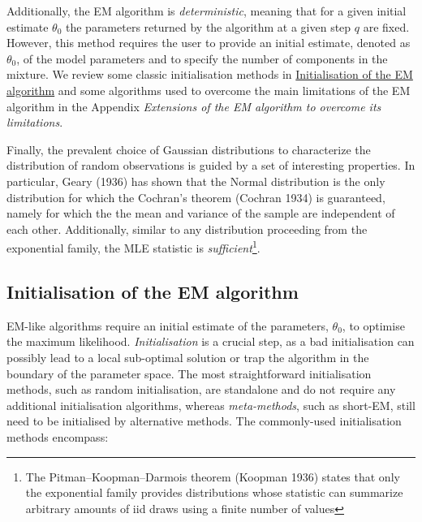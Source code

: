 Additionally, the EM algorithm is \emph{deterministic}, meaning that for a
given initial estimate \(\theta_0\) the parameters returned by the
algorithm at a given step \(q\) are fixed. However, this method requires the user to provide an initial estimate, denoted as \(\theta_0\), of the model parameters and to specify the number of components in the mixture. We review some classic
initialisation methods in \protect\hyperlink{initialisation-of-the-em-algorithm}{Initialisation of the EM algorithm} and some
algorithms used to overcome the main limitations of the EM
algorithm in the Appendix \emph{Extensions of the EM algorithm to overcome its limitations}.

Finally, the prevalent choice of Gaussian distributions to characterize the distribution of random observations is guided by a set of interesting properties. In particular, Geary (1936) has shown that the Normal distribution is the only distribution for which the Cochran's theorem (Cochran 1934) is guaranteed, namely for which the the mean and variance of the sample are independent of each other. Additionally, similar to any distribution proceeding from the exponential family, the MLE statistic is \emph{sufficient}\footnote{The Pitman--Koopman--Darmois theorem (Koopman 1936) states that only the exponential family provides distributions whose statistic can summarize arbitrary amounts of iid draws using a finite number of values}.

\hypertarget{initialisation-of-the-em-algorithm}{%
\subsection{Initialisation of the EM algorithm}\label{initialisation-of-the-em-algorithm}}

EM-like algorithms require an initial estimate of the parameters, \(\theta_0\), to
optimise the maximum likelihood. \emph{Initialisation} is a crucial step, as
a bad initialisation can possibly lead to a local sub-optimal solution
or trap the algorithm in the boundary of the parameter space. The most straightforward initialisation methods, such as random initialisation, are standalone and do not require any additional initialisation algorithms, whereas \emph{meta-methods}, such as short-EM, still need to be initialised by alternative methods. The commonly-used initialisation methods encompass:

